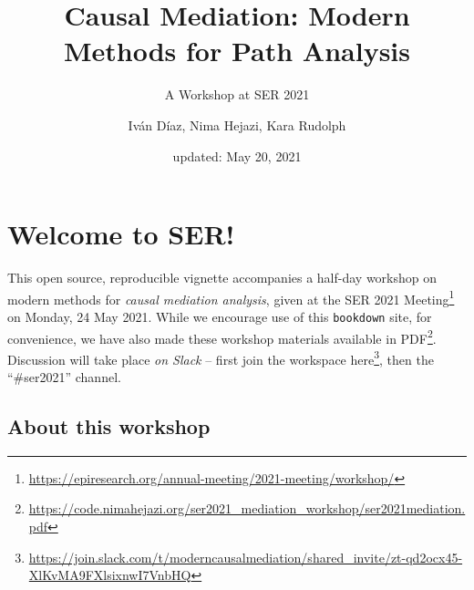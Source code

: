 \documentclass[
  12pt,
]{book}
\title{Causal Mediation: Modern Methods for Path Analysis}
\subtitle{A Workshop at SER 2021}
\author{Iván Díaz, Nima Hejazi, Kara Rudolph}
\date{updated: May 20, 2021}
\newcommand{\passthrough}[1]{#1}
\renewcommand{\href}[2]{#2\footnote{\url{#1}}}
\theoremstyle{definition}
\theoremstyle{definition}
\theoremstyle{definition}
\newcommand{\1}{\mathbbm{1}}
\begin{document}
\maketitle


\thispagestyle{empty}

\begin{center}
\end{center}

\setlength{\abovedisplayskip}{-5pt}
\setlength{\abovedisplayshortskip}{-5pt}

\mainmatter

{
\hypersetup{linkcolor=}
\setcounter{tocdepth}{2}
\tableofcontents
}
\hypertarget{welcome-to-ser}{%
\chapter*{Welcome to SER!}\label{welcome-to-ser}}


This open source, reproducible vignette accompanies a half-day workshop on
modern methods for \emph{causal mediation analysis}, given at the \href{https://epiresearch.org/annual-meeting/2021-meeting/workshop/}{SER 2021
Meeting} on
Monday, 24 May 2021. While we encourage use of this \passthrough{\lstinline!bookdown!} site, for
convenience, we have also made these workshop materials \href{https://code.nimahejazi.org/ser2021_mediation_workshop/ser2021mediation.pdf}{available in
PDF}.
Discussion will take place \emph{on Slack} -- first join the workspace
\href{https://join.slack.com/t/moderncausalmediation/shared_invite/zt-qd2ocx45-XlKvMA9FXlsixnwI7VnbHQ}{here},
then the ``\#ser2021'' channel.

\hypertarget{about}{%
\section{About this workshop}\label{about}}
\end{document}
